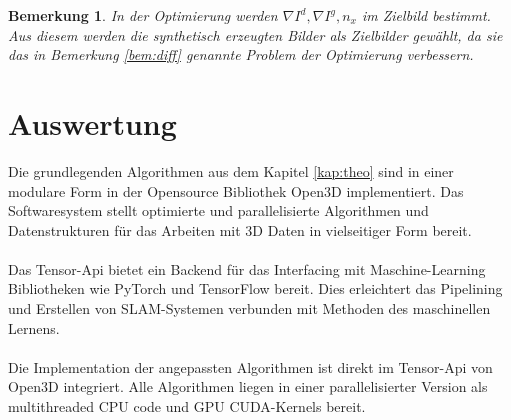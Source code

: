 \documentclass[12pt,DIV=15,BCOR=15mm,twoside,headsepline,abstract=true,listof=totoc,bibliography=totoc]{scrreprt}
\newtheorem{remark}{Bemerkung}[chapter]
\theoremstyle{remark}    %
\begin{document}
    \begin{remark} \label{bem:tsdf_systh_pic_smooth}
    In der Optimierung werden $\nabla I^d,\nabla I^g, n_x$ im Zielbild bestimmt. Aus diesem werden die synthetisch erzeugten Bilder 
    als Zielbilder gewählt, da sie das in Bemerkung \ref{bem:diff} genannte Problem der Optimierung verbessern.
    \end{remark}
    \section{Auswertung}
    Die grundlegenden Algorithmen aus dem Kapitel \ref{kap:theo} sind in einer modulare Form in der Opensource Bibliothek Open3D \cite{Zhou2018} implementiert. Das Softwaresystem
    stellt optimierte und parallelisierte Algorithmen und Datenstrukturen für das Arbeiten mit 3D Daten in vielseitiger Form bereit.\\\\
    Das Tensor-Api bietet ein Backend für das Interfacing mit Maschine-Learning Bibliotheken wie PyTorch und TensorFlow bereit. Dies erleichtert das Pipelining und 
    Erstellen von \ac{SLAM}-Systemen verbunden mit Methoden des maschinellen Lernens.\\\\
    Die Implementation der angepassten Algorithmen ist direkt im Tensor-Api von Open3D integriert.
    Alle Algorithmen liegen in einer parallelisierter Version als multithreaded CPU code und GPU CUDA-Kernels bereit.
\end{document}
